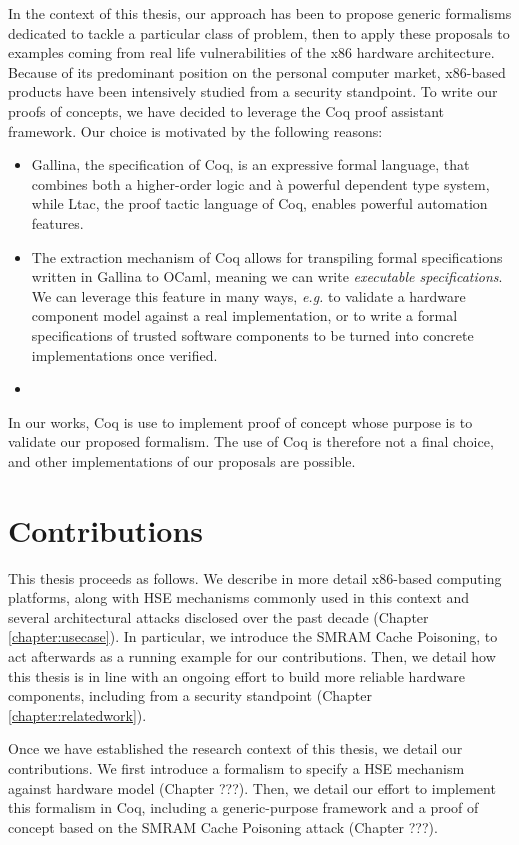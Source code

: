 In the context of this thesis, our approach has been to propose generic
formalisms dedicated to tackle a particular class of problem, then to apply
these proposals to examples coming from real life vulnerabilities of the x86
hardware architecture.
%
Because of its predominant position on the personal computer market, x86-based
products have been intensively studied from a security standpoint.
%
To write our proofs of concepts, we have decided to leverage the Coq proof
assistant framework.
%
Our choice is motivated by the following reasons:
%
\begin{itemize}
\item {\sc Gallina}, the specification of Coq, is an expressive formal language,
  that combines both a higher-order logic and à powerful dependent type system,
  while {\sc Ltac}, the proof tactic language of Coq, enables powerful
  automation features.
\item The extraction mechanism of Coq allows for transpiling formal
  specifications written in {\sc Gallina} to OCaml, meaning we can write
  \emph{executable specifications}. We can leverage this feature in many ways,
  \emph{e.g.} to validate a hardware component model against a real
  implementation, or to write a formal specifications of trusted software
  components to be turned into concrete implementations once verified.
\item {}
\end{itemize}

In our works, Coq is use to implement proof of concept whose purpose is to
validate our proposed formalism.
%
The use of Coq is therefore not a final choice, and other implementations of our
proposals are possible.

\section{Contributions}

This thesis proceeds as follows.
%
We describe in more detail x86-based computing platforms, along with HSE
mechanisms commonly used in this context and several architectural attacks
disclosed over the past decade (Chapter\,\ref{chapter:usecase}).
%
In particular, we introduce the SMRAM Cache Poisoning, to act afterwards as a
running example for our contributions.
%
Then, we detail how this thesis is in line with an ongoing effort to build more
reliable hardware components, including from a security standpoint
(Chapter\,\ref{chapter:relatedwork}).

Once we have established the research context of this thesis, we detail our
contributions.
%
We first introduce a formalism to specify a HSE mechanism against hardware model
(Chapter ???).
%
Then, we detail our effort to implement this formalism in Coq, including a
generic-purpose framework and a proof of concept based on the SMRAM Cache
Poisoning attack (Chapter ???).
%
